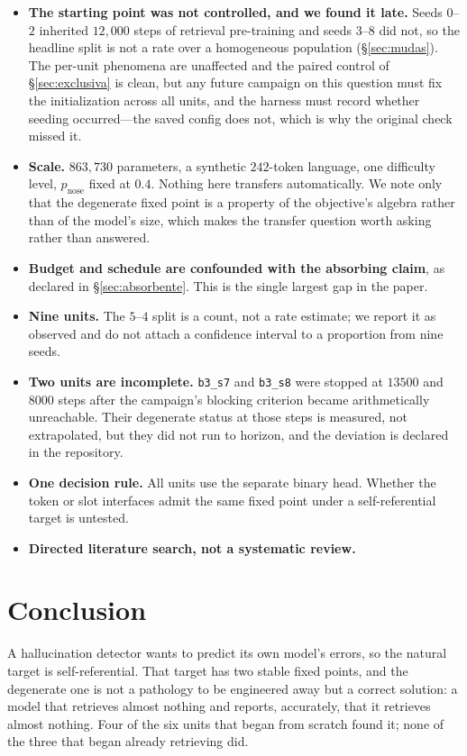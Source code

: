 \documentclass[11pt]{article}
\begin{document}
\begin{itemize}
\item \textbf{The starting point was not controlled, and we found it late.} Seeds $0$--$2$ inherited
$12{,}000$ steps of retrieval pre-training and seeds $3$--$8$ did not, so the headline split is not a
rate over a homogeneous population (\S\ref{sec:mudas}). The per-unit phenomena are unaffected and the
paired control of \S\ref{sec:exclusiva} is clean, but any future campaign on this question must fix
the initialization across all units, and the harness must record whether seeding occurred---the saved
config does not, which is why the original check missed it.
\item \textbf{Scale.} $863{,}730$ parameters, a synthetic $242$-token language, one difficulty level,
$p_{\mathrm{nose}}$ fixed at $0.4$. Nothing here transfers automatically. We note only that the
degenerate fixed point is a property of the objective's algebra rather than of the model's size,
which makes the transfer question worth asking rather than answered.
\item \textbf{Budget and schedule are confounded with the absorbing claim}, as declared in
\S\ref{sec:absorbente}. This is the single largest gap in the paper.
\item \textbf{Nine units.} The $5$--$4$ split is a count, not a rate estimate; we report it as
observed and do not attach a confidence interval to a proportion from nine seeds.
\item \textbf{Two units are incomplete.} \texttt{b3\_s7} and \texttt{b3\_s8} were stopped at $13500$
and $8000$ steps after the campaign's blocking criterion became arithmetically unreachable. Their
degenerate status at those steps is measured, not extrapolated, but they did not run to horizon, and
the deviation is declared in the repository.
\item \textbf{One decision rule.} All units use the separate binary head. Whether the token or slot
interfaces admit the same fixed point under a self-referential target is untested.
\item \textbf{Directed literature search, not a systematic review.}
\end{itemize}

\section{Conclusion}

A hallucination detector wants to predict its own model's errors, so the natural target is
self-referential. That target has two stable fixed points, and the degenerate one is not a
pathology to be engineered away but a correct solution: a model that retrieves almost nothing and
reports, accurately, that it retrieves almost nothing. Four of the six units that began from scratch
found it; none of the three that began already retrieving did.
\end{document}
